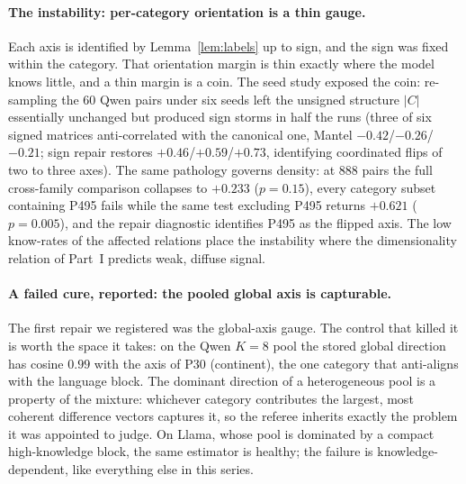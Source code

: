 \documentclass[11pt]{article}
\begin{document}
\paragraph{The instability: per-category orientation is a thin gauge.}
Each axis is identified by Lemma~\ref{lem:labels} up to sign, and the sign
was fixed within the category. That orientation margin is thin exactly
where the model knows little, and a thin margin is a coin. The seed study
exposed the coin: re-sampling the $60$ Qwen pairs under six seeds left the
unsigned structure $|C|$ essentially unchanged but produced sign storms in
half the runs (three of six signed matrices anti-correlated with the
canonical one, Mantel $-0.42$/$-0.26$/$-0.21$; sign repair restores
$+0.46$/$+0.59$/$+0.73$, identifying coordinated flips of two to three
axes). The same pathology governs density: at $888$ pairs the full
cross-family comparison collapses to $+0.233$ ($p = 0.15$), every category
subset containing P495 fails while the same test excluding P495 returns
$+0.621$ ($p = 0.005$), and the repair diagnostic identifies P495 as the
flipped axis. The low know-rates of the affected relations place the
instability where the dimensionality relation of Part~I predicts weak,
diffuse signal.

\paragraph{A failed cure, reported: the pooled global axis is capturable.}
The first repair we registered was the global-axis gauge. The control that
killed it is worth the space it takes: on the Qwen $K{=}8$ pool the stored
global direction has cosine $0.99$ with the axis of P30 (continent), the
one category that anti-aligns with the language block. The dominant
direction of a heterogeneous pool is a property of the mixture: whichever
category contributes the largest, most coherent difference vectors
captures it, so the referee inherits exactly the problem it was appointed
to judge. On Llama, whose pool is dominated by a compact high-knowledge
block, the same estimator is healthy; the failure is knowledge-dependent,
like everything else in this series.
\end{document}
